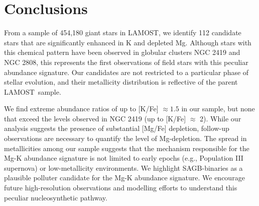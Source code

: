 \documentclass[a4paper,fleqn,usenatbib]{mnras}
\newcommand{\todo}[1]{\textcolor{red}{#1}}
\newcommand{\project}[1]{#1}
\newcommand{\lamost}{\project{LAMOST}}
\begin{document}




\section{Conclusions}
\label{sec:conclusion}
From a sample of 454,180 giant stars in \lamost, we identify 112 candidate stars that are significantly enhanced in K and depleted Mg. Although stars with this chemical pattern have been observed in globular clusters NGC 2419 and NGC 2808, this represents the first observations of field stars with this peculiar abundance signature. Our candidates are not restricted to a particular phase of stellar evolution, and their metallicity distribution is reflective of the parent \lamost\ sample.

We find extreme abundance ratios of up to [K/Fe] $\approx 1.5$ in our sample, but none that exceed the levels observed in NGC 2419 (up to [K/Fe] $\approx$ 2). While our analysis suggests the presence of substantial [Mg/Fe] depletion, follow-up observations are necessary to quantify the level of Mg-depletion. The spread in metallicities among our sample suggests that the mechanism responsible for the Mg-K abundance signature is not limited to early epochs (e.g., Population III supernova) or low-metallicity environments. We highlight SAGB-binaries as a plausible polluter candidate for the Mg-K abundance signature. We encourage future high-resolution observations and modelling efforts to understand this peculiar nucleosynthetic pathway.
\end{document}

